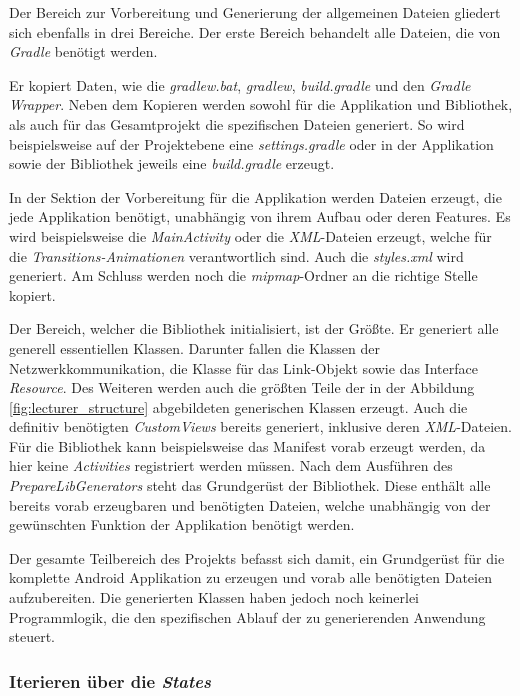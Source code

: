 Der Bereich zur Vorbereitung und Generierung der allgemeinen Dateien gliedert sich ebenfalls in drei Bereiche. Der erste Bereich behandelt alle Dateien, die von \textit{Gradle} benötigt werden. 

Er kopiert Daten, wie die \textit{gradlew.bat}, \textit{gradlew}, \textit{build.gradle} und den \textit{Gradle Wrapper}. 
Neben dem Kopieren werden sowohl für die Applikation und Bibliothek, als auch für das Gesamtprojekt die spezifischen Dateien generiert. So wird beispielsweise auf der Projektebene eine \textit{settings.gradle} oder in der Applikation sowie der Bibliothek jeweils eine \textit{build.gradle} erzeugt.

In der Sektion der Vorbereitung für die Applikation werden Dateien erzeugt, die jede Applikation benötigt, unabhängig von ihrem Aufbau oder deren Features. Es wird beispielsweise die \textit{MainActivity} oder die \textit{XML}-Dateien erzeugt, welche für die \textit{Transitions-Animationen} verantwortlich sind. Auch die \textit{styles.xml} wird generiert. Am Schluss werden noch die \textit{mipmap}-Ordner an die richtige Stelle kopiert.

Der Bereich, welcher die Bibliothek initialisiert, ist der Größte. Er generiert alle generell essentiellen Klassen. Darunter fallen die Klassen der Netzwerkkommunikation, die Klasse für das Link-Objekt sowie das Interface \textit{Resource}. Des Weiteren werden auch die größten Teile der in der Abbildung \ref{fig:lecturer_structure} abgebildeten generischen Klassen erzeugt. Auch die definitiv benötigten \textit{CustomViews} bereits generiert, inklusive deren \textit{XML}-Dateien. Für die Bibliothek kann beispielsweise das Manifest vorab erzeugt werden, da hier keine \textit{Activities} registriert werden müssen. Nach dem Ausführen des \textit{PrepareLibGenerators} steht das Grundgerüst der Bibliothek. Diese enthält alle bereits vorab erzeugbaren und benötigten Dateien, welche unabhängig von der gewünschten Funktion der Applikation benötigt werden. 

Der gesamte Teilbereich des Projekts befasst sich damit, ein Grundgerüst für die komplette Android Applikation zu erzeugen und vorab alle benötigten Dateien aufzubereiten. Die generierten Klassen haben jedoch noch keinerlei Programmlogik, die den spezifischen Ablauf der zu generierenden Anwendung steuert.

\subsubsection{Iterieren über die \textit{States}}

